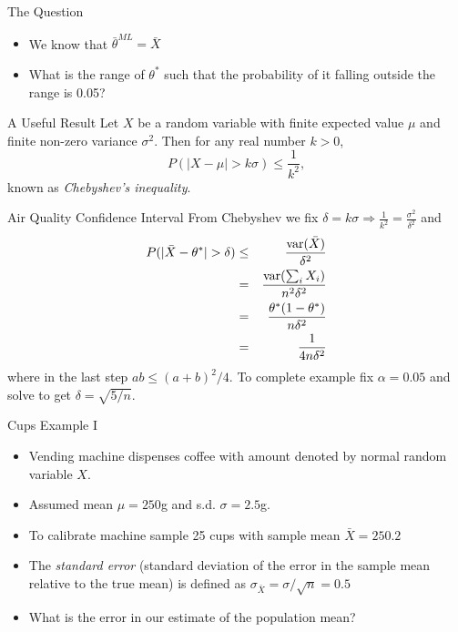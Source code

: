 \documentclass{beamer}
\begin{document}
 \begin{frame}{The Question}  
 \begin{itemize} 
  \item We know that $\bar{\theta}^{ML} = \bar{X}$ 
  \item What is the range of $\theta^*$ such that the probability of it falling outside the range is 0.05? 
 \end{itemize}
 \end{frame}

\begin{frame}{A Useful Result} 
Let $X$ be a random variable with finite expected value $\mu$ and finite non-zero variance $\sigma^2$. Then for any real number $k > 0$, 
\begin{displaymath} 
 P(|X - \mu| > k \sigma) \leq \frac{1}{k^2},
\end{displaymath}
known as \emph{Chebyshev's inequality}. 
\end{frame}

\begin{frame}{Air Quality Confidence Interval}  
From  Chebyshev we fix $\delta = k\sigma \Rightarrow \frac{1}{k^2} = \frac{\sigma^2}{\delta^2}$ and 
\begin{eqnarray*} 
 P(|\bar{X} - \theta^*| > \delta) &\leq& \frac{\mbox{var}(\bar{X})}{\delta^2} \\
&=& \frac{\mbox{var}(\sum_i X_i)}{n^2\delta^2} \\ 
&=& \frac{\theta^*(1 - \theta^*)}{n\delta^2}  \\ 
&=& \frac{1}{4n\delta^2}  
\end{eqnarray*}
where in the last step $ab \leq (a+b)^2/4$. To complete example fix $\alpha = 0.05$ and solve to get $\delta = \sqrt{5/n}$. 
\end{frame}

\begin{frame}{Cups Example I}  
\begin{itemize} 
 \item Vending machine dispenses coffee with amount denoted by normal random variable $X$.  
 \item Assumed mean $\mu = 250$g and s.d. $\sigma = 2.5$g. 
 \item To calibrate machine sample 25 cups with sample mean $\bar{X} = 250.2$
 \item The \emph{standard error} (standard deviation of the error in the sample mean relative to the true mean) is defined as $\sigma_{\bar{X}} = \sigma/\sqrt{n} = 0.5$ 
 \item What is the error in our estimate of the population mean? 
\end{itemize}
\end{frame}
\end{document}
